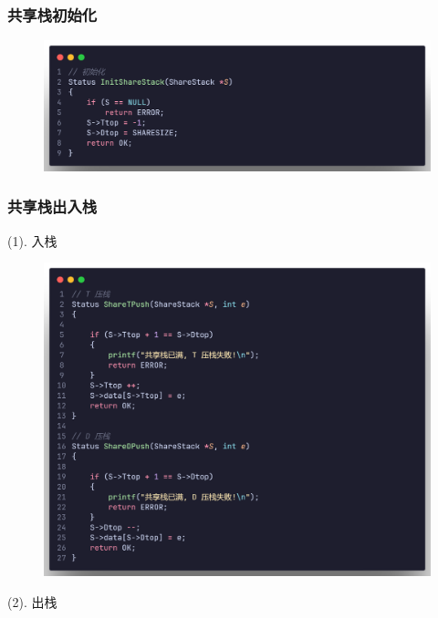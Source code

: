 \subsubsection{共享栈初始化}

\begin{figure}[H]
    \centering
    \includegraphics[scale=0.2]{"figure/Note/Stack/SSInit.png"}
\end{figure}

\subsubsection{共享栈出入栈}

(1). 入栈

\begin{figure}[H]
    \centering
    \includegraphics[scale=0.2]{"figure/Note/Stack/SSPush.png"}
\end{figure}

(2). 出栈

